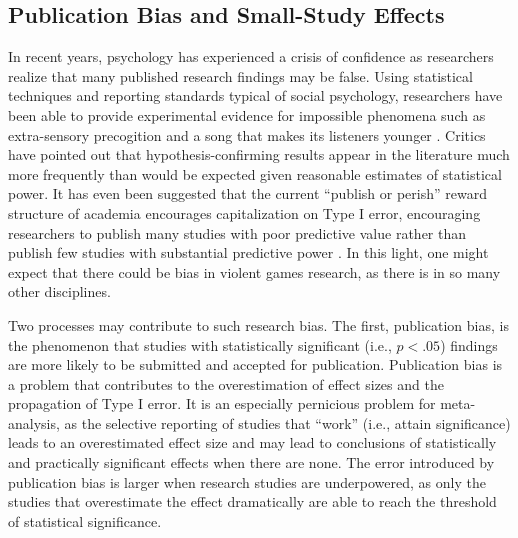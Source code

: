 \documentclass[man]{apa6}
\begin{document}
\subsection{Publication Bias and Small-Study Effects}
In recent years, psychology has experienced a crisis of confidence as researchers realize that many published research findings may be false. Using statistical techniques and reporting standards typical of social psychology, researchers have been able to provide experimental evidence for impossible phenomena such as extra-sensory precogition \citep[psi;][]{Bem:2011} and a song that makes its listeners younger \citep{Simmons:etal:2011}. Critics have pointed out that hypothesis-confirming results appear in the literature much more frequently than would be expected given reasonable estimates of statistical power. %
It has even been suggested that the current ``publish or perish'' reward structure of academia encourages capitalization on Type I error, encouraging researchers to publish many studies with poor predictive value rather than publish few studies with substantial predictive power \citep{Bakker:etal:2011}. In this light, one might expect that there could be bias in violent games research, as there is in so many other disciplines. 

Two processes may contribute to such research bias. The first, publication bias, is the phenomenon that studies with statistically significant (i.e., $p<.05$) findings are more likely to be submitted and accepted for publication. Publication bias is a problem that contributes to the overestimation of effect sizes and the propagation of Type I error. It is an especially pernicious problem for meta-analysis, as the selective reporting of studies that ``work'' (i.e., attain significance) leads to an overestimated effect size and may lead to conclusions of statistically and practically significant effects when there are none. The error introduced by publication bias is larger when research studies are underpowered, as only the studies that overestimate the effect dramatically are able to reach the threshold of statistical significance.
\end{document}
